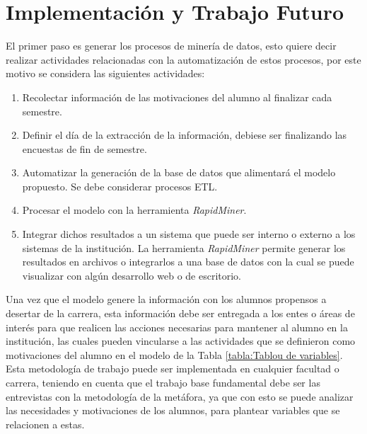 \section{Implementación y Trabajo Futuro}

El primer paso es generar los procesos de minería de datos, esto quiere decir realizar actividades relacionadas con la automatización de estos procesos, por este motivo se considera las siguientes actividades:

\begin{enumerate}
	\item Recolectar información de las motivaciones del alumno al finalizar cada semestre.
	\item Definir el día de la extracción de la información, debiese ser finalizando las encuestas de fin de semestre.
	\item Automatizar la generación de la base de datos que alimentará el modelo propuesto. Se debe considerar procesos ETL.
	\item Procesar el modelo con la herramienta \textit{RapidMiner}.
	\item Integrar dichos resultados a un sistema que puede ser interno o externo a los sistemas de la institución. La herramienta \textit{RapidMiner} permite generar los resultados en archivos o integrarlos a una base de datos con la cual se puede visualizar con algún desarrollo web o de escritorio.
\end{enumerate}

Una vez que el modelo genere la información con los alumnos propensos a desertar de la carrera, esta información debe ser entregada a los entes o áreas de interés para que realicen las acciones necesarias para mantener al alumno en la institución, las cuales pueden vincularse a las actividades que se definieron como motivaciones del alumno en el modelo de la Tabla \ref{tabla:Tablou de variables}.\\

Esta metodología de trabajo puede ser implementada en cualquier facultad o carrera, teniendo en cuenta que el trabajo base fundamental debe ser las entrevistas con la metodología de la metáfora, ya que con esto se puede analizar las necesidades y motivaciones de los alumnos, para plantear variables que se relacionen a estas.\\

